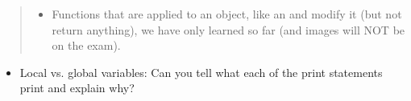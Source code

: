\documentclass[letterpaper,10pt,english]{sphinxmanual}
\begin{document}
\begin{quote}
\begin{itemize}
\end{itemize}
\begin{quote}

%
\begin{sphinxVerbatim}[commandchars=\\\{\}]
  
\end{sphinxVerbatim}
\end{quote}
\begin{itemize}
\item {} 
Functions that are applied to an object, like an  and
modify it (but not return anything), we have only learned 
so far (and images will NOT be on the exam).

\end{itemize}
\begin{quote}

%
\begin{sphinxVerbatim}[commandchars=\\\{\}]
   
\end{sphinxVerbatim}
\end{quote}
\end{quote}
\begin{itemize}
\item {} 
Local vs. global variables: Can you tell what each of the print statements
print and explain why?

\end{itemize}
\end{document}
